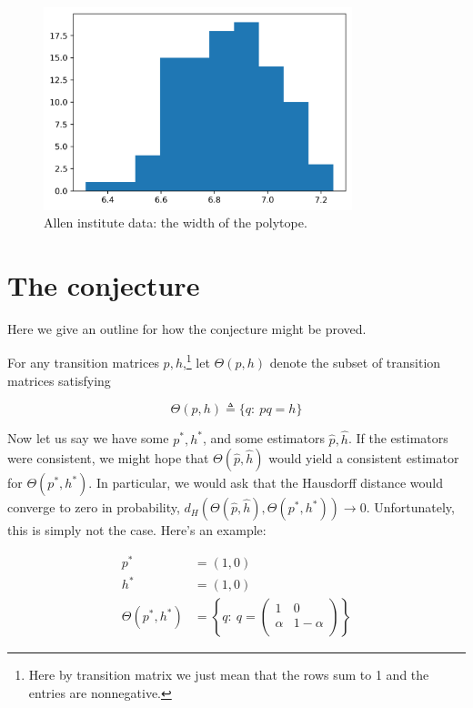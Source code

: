 \begin{figure}
\includegraphics[width=0.8\textwidth]{pics/allenwidths}
\caption{Allen institute data: the width of the polytope.\label{fig:allenwidths}}
\end{figure}

\section{The conjecture}

Here we give an outline for how the conjecture might be proved.

For any transition matrices $p,h$,\footnote{Here by transition matrix we just mean that the rows sum to 1 and the entries are nonnegative.} let $\Theta(p,h)$ denote the subset of transition matrices satisfying

\[
\Theta(p,h) \triangleq \{q:\ pq=h\}
\]

Now let us say we have some $p^*,h^*$, and some estimators $\hat p,\hat h$.  If the estimators were consistent, we might hope that $\Theta(\hat p,\hat h)$ would yield a consistent estimator for $\Theta(p^*,h^*)$.  In particular, we would ask that the Hausdorff distance would converge to zero in probability, $d_H(\Theta(\hat p,\hat h),\Theta(p^*,h^*))\rightarrow 0$.  Unfortunately, this is simply not the case.  Here's an example:

\begin{align*}
p^* &= (1, 0)\\
h^* &= (1, 0)\\
\Theta(p^*,h^*) &= 
  \left\{q:\ q=\left(\begin{array}{cc}
  1 & 0 \\
  \alpha & 1-\alpha \\
  \end{array}\right)\right\}
\end{align*}

